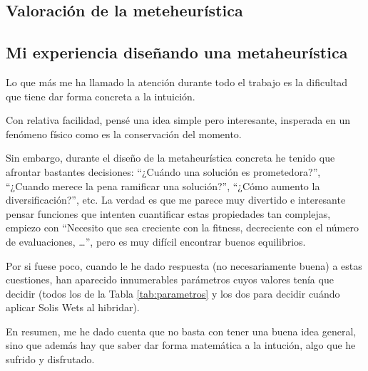 \documentclass{article}
\begin{document}
\subsection{Valoración de la meteheurística}

\subsection{Mi experiencia diseñando una metaheurística}

Lo que más me ha llamado la atención durante todo el trabajo es la dificultad que tiene dar forma concreta a la intuición.

Con relativa facilidad, pensé una idea simple pero interesante, insperada en un fenómeno físico como es la conservación del momento.

Sin embargo, durante el diseño de la metaheurística concreta he tenido que afrontar bastantes decisiones: ``¿Cuándo una solución es prometedora?'', ``¿Cuando merece la pena ramificar una solución?'', ``¿Cómo aumento la diversificación?'', etc. La verdad es que me parece muy divertido e interesante pensar
 funciones que intenten cuantificar estas propiedades tan complejas, empiezo con ``Necesito que sea creciente con la fitness, decreciente
 con el número de evaluaciones, \ldots'', pero es muy difícil encontrar buenos equilibrios.

Por si fuese poco, cuando le he dado respuesta (no necesariamente buena) a estas cuestiones, han aparecido innumerables parámetros cuyos
valores tenía que decidir (todos los de la Tabla \ref{tab:parametros} y los dos para decidir cuándo aplicar Solis Wets al hibridar).

En resumen, me he dado cuenta que no basta con tener una buena idea general, sino que además hay que saber dar forma matemática a la intución,
algo que he sufrido y disfrutado.
\end{document}
